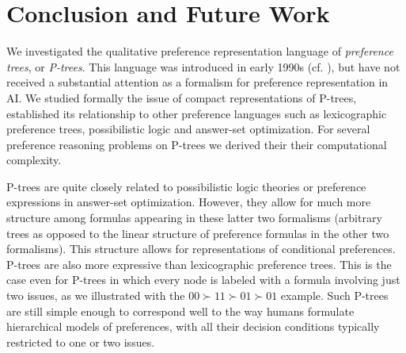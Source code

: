 %
%


\section{Conclusion and Future Work}

We investigated the qualitative preference representation language of 
\textit{preference trees}, or \textit{P-trees}. This language was 
introduced in early 1990s (cf. \cite{fraser1993,fraser1994}), but have 
not received a substantial attention as a formalism for preference 
representation in AI. We studied formally the issue of compact 
representations of
P-trees, established its relationship to other preference languages
such as lexicographic preference trees, possibilistic logic and
answer-set optimization. For several preference reasoning problems 
on P-trees we derived their their computational complexity.

P-trees are quite closely related to possibilistic logic theories or
preference expressions in answer-set optimization. However, they allow
for much more structure among formulas appearing in these latter two
formalisms (arbitrary trees as opposed to the linear structure of 
preference formulas in the other two formalisms). This structure allows 
for representations of conditional preferences. P-trees are also more
expressive than lexicographic preference trees. This is the case even 
for P-trees in which every node is labeled with a formula involving just
two issues, as we illustrated with the $00\succ 11\succ 01\succ 01$ 
example. Such P-trees are still simple enough to correspond well to
the way humans formulate hierarchical models of preferences, with all
their decision conditions typically restricted to one or two issues. 

